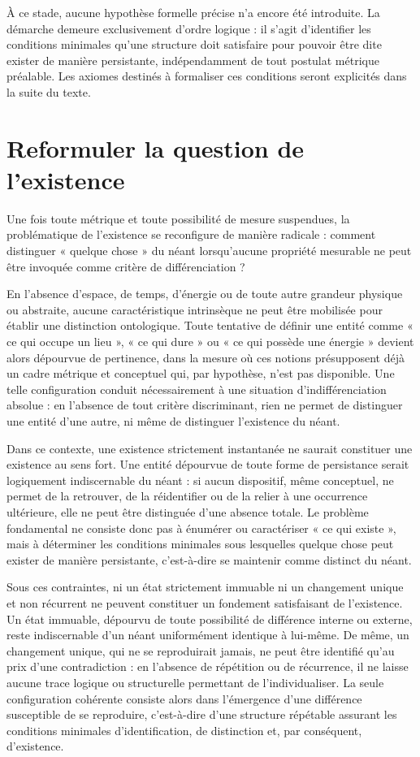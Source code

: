 \documentclass[11pt,a4paper]{article}
\begin{document}
À ce stade, aucune hypothèse formelle précise n’a encore été introduite. La démarche demeure exclusivement d’ordre logique : il s’agit d’identifier les conditions minimales qu’une structure doit satisfaire pour pouvoir être dite exister de manière persistante, indépendamment de tout postulat métrique préalable. Les axiomes destinés à formaliser ces conditions seront explicités dans la suite du texte.

\section{Reformuler la question de l’existence}

Une fois toute métrique et toute possibilité de mesure suspendues, la problématique de l’existence se reconfigure de manière radicale : comment distinguer « quelque chose » du néant lorsqu’aucune propriété mesurable ne peut être invoquée comme critère de différenciation ?

En l’absence d’espace, de temps, d’énergie ou de toute autre grandeur physique ou abstraite, aucune caractéristique intrinsèque ne peut être mobilisée pour établir une distinction ontologique. Toute tentative de définir une entité comme « ce qui occupe un lieu », « ce qui dure » ou « ce qui possède une énergie » devient alors dépourvue de pertinence, dans la mesure où ces notions présupposent déjà un cadre métrique et conceptuel qui, par hypothèse, n’est pas disponible. Une telle configuration conduit nécessairement à une situation d’indifférenciation absolue : en l’absence de tout critère discriminant, rien ne permet de distinguer une entité d’une autre, ni même de distinguer l’existence du néant.

Dans ce contexte, une existence strictement instantanée ne saurait constituer une existence au sens fort. Une entité dépourvue de toute forme de persistance serait logiquement indiscernable du néant : si aucun dispositif, même conceptuel, ne permet de la retrouver, de la réidentifier ou de la relier à une occurrence ultérieure, elle ne peut être distinguée d’une absence totale. Le problème fondamental ne consiste donc pas à énumérer ou caractériser « ce qui existe », mais à déterminer les conditions minimales sous lesquelles quelque chose peut exister de manière persistante, c’est-à-dire se maintenir comme distinct du néant.

Sous ces contraintes, ni un état strictement immuable ni un changement unique et non récurrent ne peuvent constituer un fondement satisfaisant de l’existence. Un état immuable, dépourvu de toute possibilité de différence interne ou externe, reste indiscernable d’un néant uniformément identique à lui-même. De même, un changement unique, qui ne se reproduirait jamais, ne peut être identifié qu’au prix d’une contradiction : en l’absence de répétition ou de récurrence, il ne laisse aucune trace logique ou structurelle permettant de l’individualiser. La seule configuration cohérente consiste alors dans l’émergence d’une différence susceptible de se reproduire, c’est-à-dire d’une structure répétable assurant les conditions minimales d’identification, de distinction et, par conséquent, d’existence.
\end{document}
